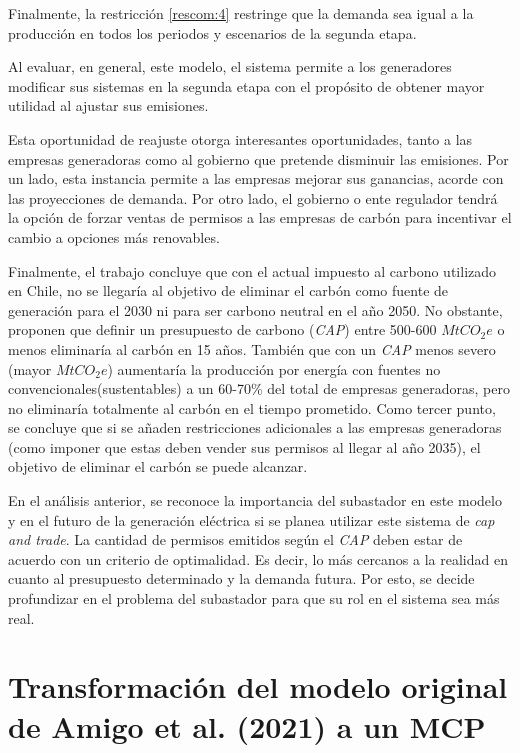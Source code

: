Finalmente, la restricción \ref{rescom:4} restringe que la demanda sea igual a la producción en todos los periodos y escenarios de la segunda etapa.
\vspace{2.5mm}

Al evaluar, en general, este modelo, el sistema permite a los generadores modificar sus sistemas en la segunda etapa con el propósito de obtener mayor utilidad al ajustar sus emisiones.
\vspace{2.5mm}

Esta oportunidad de reajuste otorga interesantes oportunidades, tanto a las empresas generadoras como al gobierno que pretende disminuir las emisiones. Por un lado, esta instancia permite a las empresas mejorar sus ganancias, acorde con las proyecciones de demanda. Por otro lado, el gobierno o ente regulador tendrá la opción de forzar ventas de permisos a las empresas de carbón para incentivar el cambio a opciones más renovables. 
\vspace{2.5mm}

Finalmente, el trabajo concluye que con el actual impuesto al carbono utilizado en Chile, no se llegaría al objetivo de eliminar el carbón como fuente de generación para el 2030 ni para ser carbono neutral en el año 2050. No obstante, proponen que definir un presupuesto de carbono (\textit{CAP}) entre 500-600 $MtCO_2 e$ o menos eliminaría al carbón en 15 años. También que con un \textit{CAP} menos severo (mayor $MtCO_2 e$) aumentaría la producción por energía con fuentes no convencionales(sustentables) a un 60-70\% del total de empresas generadoras, pero no eliminaría totalmente al carbón en el tiempo prometido. Como tercer punto, se concluye que si se añaden restricciones adicionales a las empresas generadoras (como imponer que estas deben vender sus permisos al llegar al año 2035), el objetivo de eliminar el carbón se puede alcanzar.
\vspace{2.5mm}

En el análisis anterior, se reconoce la importancia del subastador en este modelo y en el futuro de la generación eléctrica si se planea utilizar este sistema de \textit{cap and trade}. La cantidad de permisos emitidos según el \textit{CAP} deben estar de acuerdo con un criterio de optimalidad. Es decir, lo más cercanos a la realidad en cuanto al presupuesto determinado y la demanda futura. Por esto, se decide profundizar en el problema del subastador para que su rol en el sistema sea más real.
\vspace{2.5mm}

\section{Transformación del modelo original de Amigo et al. (2021) a un MCP}

